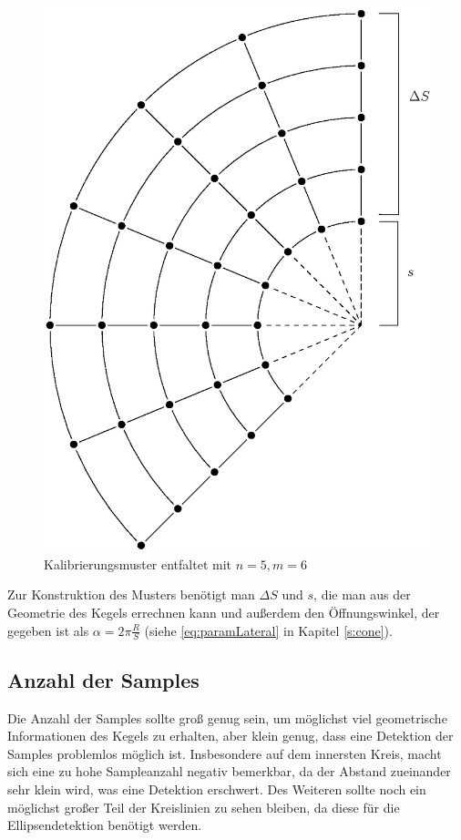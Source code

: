 \begin{figure}[!htb]
	\centering
	\includegraphics[scale=.7]{images/calibrationPattern2.eps}
	\caption{Kalibrierungsmuster entfaltet mit $n = 5, m = 6$}
	\label{fig:calibrationPattern}
\end{figure}

Zur Konstruktion des Musters benötigt man $\Delta S$ und $s$, die man aus der Geometrie des Kegels errechnen kann und außerdem den Öffnungswinkel, der gegeben ist als $\alpha = 2\pi\frac{R}{S}$ (siehe \ref{eq:paramLateral} in Kapitel \ref{s:cone}).

\subsection{Anzahl der Samples}
Die Anzahl der Samples sollte groß genug sein, um möglichst viel geometrische Informationen des Kegels zu erhalten, aber klein genug, dass eine Detektion der Samples problemlos möglich ist. Insbesondere auf dem innersten Kreis, macht sich eine zu hohe Sampleanzahl negativ bemerkbar, da der Abstand zueinander sehr klein wird, was eine Detektion erschwert. Des Weiteren sollte noch ein möglichst großer Teil der Kreislinien zu sehen bleiben, da diese für die Ellipsendetektion benötigt werden. 


